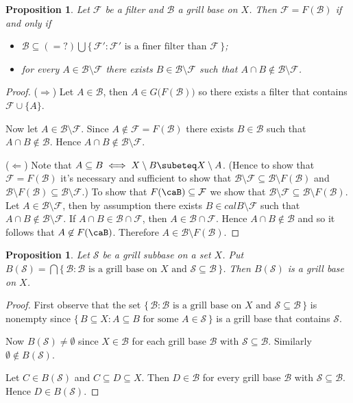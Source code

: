 \documentclass[12pt]{article}
\theoremstyle{plain}
\newtheorem{prop}[thm]{Proposition}
\theoremstyle{definition}
\newcommand{\calB}{\mathcal{B}}
\newcommand{\calF}{\mathcal{F}}
\newcommand{\calS}{\mathcal{S}}
\begin{document}
\begin{prop}
  Let $\calF$ be a filter and $\calB$ a grill base on $X$.
  Then $\calF = F(\calB)$ if and only if 
  \begin{itemize}
    \item[(1)] $\calB \subseteq (=?) \bigcup\{\, \calF' : \calF'
      \mbox{ is a finer filter than } \calF \,\}$;

    \item[(2)] for every $A \in \calB \setminus \calF$ there exists $B
      \in \calB \setminus \calF$ such that $A \cap B \not \in \calB
      \setminus \calF$. 
  \end{itemize}
\end{prop}
\begin{proof}
  ($\Rightarrow$)
  Let $A \in \calB$, then $A \in G\bigl(F(\calB)\bigr)$ so there
  exists a filter that contains $\calF \cup \{A\}$.

  Now let $A \in \calB\setminus\calF$.
  Since $A \not\in \calF = F(\calB)$ there exists $B \in
  \calB$ such that $A \cap B \not \in \calB$.
  Hence $A \cap B \not\in \calB \setminus \calF$.   

  ($\Leftarrow$)
  Note that $A \subseteq B \iff X \setminus B \subeteq X \setminus
  A$. 
  (Hence to show that $\calF = F(\calB)$ it's necessary and sufficient 
  to show that $\calB \setminus \calF  \subseteq \calB \setminus
  F(\calB)$ and $\calB \setminus F(\calB) \subseteq \calB \setminus
  \calF$.)
  To show that $F(\caB) \subseteq \calF$ we show that $\calB \setminus
  \calF \subseteq \calB \setminus F(\calB)$.
  Let $A \in \calB \setminus \calF$, then by assumption there exists
  $B \in calB \setminus \calF$ such that $A \cap B \not\in \calB
  \setminus \calF$. 
  If $A \cap B \in \calB \cap \calF$, then $A \in \calB \cap \calF$. 
  Hence $A \cap B \not\in \calB$ and so it follows that $A \not\in
  F(\caB)$.
  Therefore $A \in \calB \setminus F(\calB)$. 
\end{proof}

\begin{prop}
  Let $\calS$ be a grill subbase on a set $X$.
  Put $B(\calS) = \bigcap \{\, \calB : \mbox{$\calB$ is a grill base
    on $X$ and $\calS \subseteq \calB$} \,\}$.
  Then $B(\calS)$ is a grill base on $X$.
\end{prop}
\begin{proof}
  First observe that the set $\{\, \calB : \mbox{$\calB$ is a grill base
    on $X$ and $\calS \subseteq \calB$} \,\}$ is nonempty since $\{\,
  B \subseteq X : \mbox{$A \subseteq B$ for some $A \in \calS$} \,\}$ is
  a grill base that contains $\calS$. 

  Now $B(\calS) \ne \emptyset$ since $X \in \calB$ for each grill base
  $\calB$ with $\calS \subseteq \calB$. 
  Similarly $\emptyset \not \in B(\calS)$.
  
  Let $C \in B(\calS)$ and $C \subseteq D \subseteq X$. 
  Then $D \in \calB$ for every grill base $\calB$ with $\calS
  \subseteq \calB$.
  Hence $D \in B(\calS)$.
\end{proof}
\end{document}
